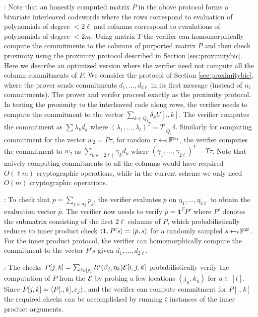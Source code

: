 : Note that an honestly computed
matrix $P$ in the above protocol forms a bivariate interleaved codewords where
the rows correspond to evaluation of polynomials of degree $<2\ell$ and columns
correspond to evaulations of polynomials of degree $<2m$. Using matrix $T$ the
verifier can homomorphically compute the commitments to the columns of
purported matrix $P$ and then check proximity using the proximity protocol
described in Section \ref{sec:proximitybic}. Here we describe an optimized
version where the verifier need not compute all the column commitments of $P$. 
We consider the protocol of Section \ref{sec:proximitybic}, where the prover
sends commitments $d_1,\ldots,d_{2\ell}$ in its first message (instead of $n_1$
commitments). The prover and verifer proceed exactly as the proximity protocol.
In testing the proximity to the interleaved code along rows, the verifier needs
to compute the commitment to the vector $\sum_{k\in Q_1}\delta_kU[.,k]$. The
verifier computes the commitment as $\sum\lambda_kd_k$ where
$(\lambda_1,\ldots,\lambda_t)^T = T|_{Q_1}\delta$. Similarly for computing
commitment for the vector $w_2=P\tau$, for random $\tau\hskip2.3pt{\gets\!\!\mbox{\tiny${\$}$\normalsize}}\, \mathbb{F}^{n_1}$, the
verifier computes the commitment to $w_2$ as $\sum_{k\in
[2\ell]}\gamma_kd_k$ where $(\gamma_1,\ldots,\gamma_{2\ell})^T=T\tau$. Note
that naively computing commitments to all the columns would have required
$O(\ell m)$ cryptographic operations, while in the current scheme we only need
$O(m)$ cryptographic operations.\smallskip

: To check that $p=\sum_{j\in
n_2}p_j$, the verifier evaluates $p$ on $\eta_1,\ldots,\eta_{2\ell}$ to obtain the
evaluation vector $\bar{p}$. The verifier now needs to verify
$\bar{p}=\bm{1}^TP'$ where $P'$ denotes the submatrix consisting of the first
$2\ell$ columns of $P$, which probabilistically reduces to inner product check
$\langle \bm{1},P's\rangle=\langle \bar{p},s\rangle$ for a randomly sampled $s\hskip2.3pt{\gets\!\!\mbox{\tiny${\$}$\normalsize}}\,
\mathbb{F}^{2\ell}$. For the inner product protocol, the verifier can homomorphically compute the commitment to the
vector $P's$ given $d_1,\ldots,d_{2\ell}$.\smallskip

: The checks
$P[j,k]=\sum_{i\in [p]} R^i(\beta_j,\eta_k)\mathcal{E}[i,j,k]$ probabilistically
verify the computation of $P$ from the $\mathcal{E}$ by probing a few locations
$(j_u,k_u)$ for $u\in [t]$. Since $P[j,k]=\langle P[.,k],e_j\rangle$, and the verifier
can compute commitment for $P[.,k]$ the required checks can be accomplished by
running $t$ instances of the inner product arguments.\smallskip


